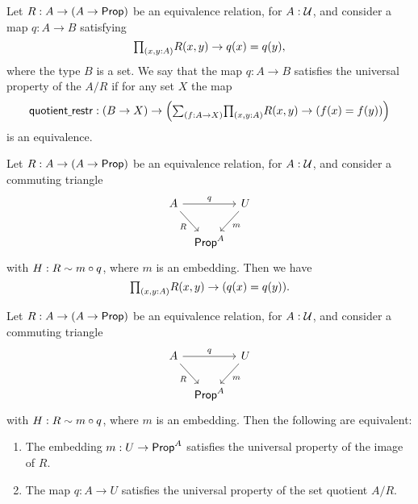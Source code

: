 \begin{defn}
Let $R:A\to (A\to \mathsf{Prop})$ be an equivalence relation, for $A:\mathcal{U}$, and consider a map $q:A\to B$ satisfying
\begin{equation*}
\prd{x,y:A}R(x,y)\to q(x)=q(y),
\end{equation*}
where the type $B$ is a set. We say that the map $q:A\to B$ satisfies the universal property of the  $A/R$ if for any set $X$ the map
\begin{equation*}
\quotientrestr : (B\to X) \to \Big(\sm{f:A\to X}\prd{x,y:A}R(x,y)\to (f(x)=f(y))\Big)
\end{equation*}
is an equivalence.
\end{defn}

\begin{lem}
Let $R:A\to (A\to \mathsf{Prop})$ be an equivalence relation, for $A:\mathcal{U}$, and consider a commuting triangle
\begin{equation*}
\begin{tikzcd}[column sep=tiny]
A \arrow[rr,"q"] \arrow[dr,swap,"R"] & & U \arrow[dl,"m"] \\
& \prop^A
\end{tikzcd}
\end{equation*}
with $H:R\sim m\circ q$, where $m$ is an embedding. Then we have
\begin{equation*}
\prd{x,y:A}R(x,y)\to (q(x)=q(y)).
\end{equation*}
\end{lem}

\begin{thm}\label{thm:quotient_up}
Let $R:A\to (A\to \mathsf{Prop})$ be an equivalence relation, for $A:\mathcal{U}$, and consider a commuting triangle
\begin{equation*}
\begin{tikzcd}[column sep=tiny]
A \arrow[rr,"q"] \arrow[dr,swap,"R"] & & U \arrow[dl,"m"] \\
& \prop^A
\end{tikzcd}
\end{equation*}
with $H:R\sim m\circ q$, where $m$ is an embedding. Then the following are equivalent:
\begin{enumerate}
\item The embedding $m:U\to \mathsf{Prop}^A$ satisfies the universal property of the image of $R$.
\item The map $q:A\to U$ satisfies the universal property of the set quotient $A/R$.
\end{enumerate}
\end{thm}

